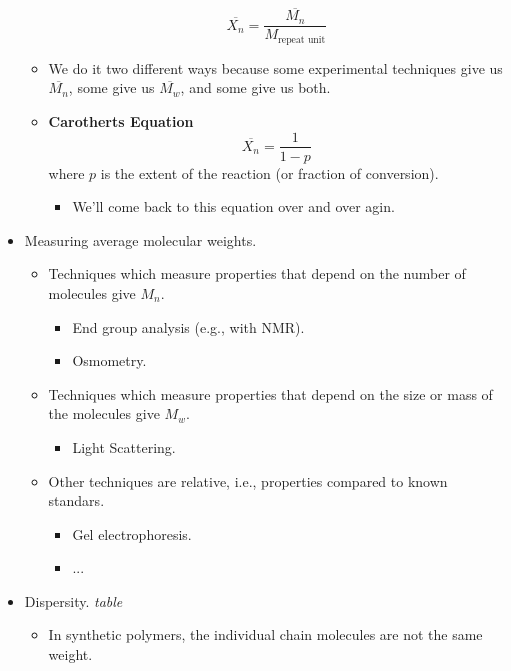 \documentclass[../notes.tex]{subfiles}
\begin{document}
\begin{itemize}
\begin{itemize}
\begin{equation*}
            \overline{X_n} = \frac{\overline{M_n}}{M_\text{repeat unit}}
        \end{equation*}
        \item We do it two different ways because some experimental techniques give us $\overline{M_n}$, some give us $\overline{M_w}$, and some give us both.
        \item \textbf{Carotherts Equation}
        \begin{equation*}
            \overline{X_n} = \frac{1}{1-p}
        \end{equation*}
        where $p$ is the extent of the reaction (or fraction of conversion).
        \begin{itemize}
            \item We'll come back to this equation over and over agin.
        \end{itemize}
    \end{itemize}
    \item Measuring average molecular weights.
    \begin{itemize}
        \item Techniques which measure properties that depend on the number of molecules give $M_n$.
        \begin{itemize}
            \item End group analysis (e.g., with NMR).
            \item Osmometry.
        \end{itemize}
        \item Techniques which measure properties that depend on the size or mass of the molecules give $M_w$.
        \begin{itemize}
            \item Light Scattering.
        \end{itemize}
        \item Other techniques are relative, i.e., properties compared to known standars.
        \begin{itemize}
            \item Gel electrophoresis.
            \item ...
        \end{itemize}
    \end{itemize}
    \item Dispersity.
    \emph{table}
    \begin{itemize}
        \item In synthetic polymers, the individual chain molecules are not the same weight.

\end{itemize}
\end{itemize}
\end{document}
